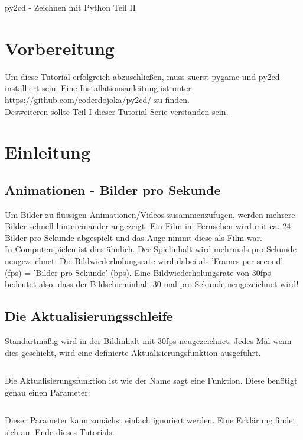 \documentclass{\VorlagenPfad/coderdojokatext}
\newcommand{\Titel}{py2cd - Zeichnen mit Python Teil II}
\begin{document}
\begin{center}
	{\huge \Titel}
\end{center}

\section{Vorbereitung}
Um diese Tutorial erfolgreich abzuschließen, muss zuerst pygame und py2cd installiert sein. Eine Installationsanleitung ist unter \url{https://github.com/coderdojoka/py2cd/} zu finden.
\\
Desweiteren sollte Teil I dieser Tutorial Serie verstanden sein.
\section{Einleitung}

\subsection{Animationen - Bilder pro Sekunde}
Um Bilder zu flüssigen Animationen/Videos zusammenzufügen, werden mehrere Bilder schnell hintereinander angezeigt. Ein Film im Fernsehen wird mit ca. 24 Bilder pro Sekunde abgespielt und das Auge nimmt diese als Film war.
\\In Computerspielen ist dies ähnlich. Der Spielinhalt wird mehrmals pro Sekunde neugezeichnet. Die Bildwiederholungsrate wird dabei als 'Frames per second' (fps) = 'Bilder pro Sekunde' (bps). Eine Bildwiederholungsrate von 30fps bedeutet also, dass der Bildschirminhalt 30 mal pro Sekunde neugezeichnet wird!

\subsection{Die Aktualisierungsschleife}
Standartmäßig wird in  der Bildinhalt mit 30fps neugezeichnet. Jedes Mal wenn dies geschieht, wird eine definierte Aktualisierungsfunktion ausgeführt.

\inputminted[firstline=3]{python}{../../../Beispiele/py2cd/aktualisierungs_funktion.py}

\begin{merkbox}
Die Aktualisierungsfunktion ist wie der Name sagt eine Funktion. Diese benötigt genau einen Parameter:

\inputminted[firstline=7, lastline=10]{python}{../../../Beispiele/py2cd/aktualisierungs_funktion.py}
\label{erklaerung}Dieser Parameter kann zunächst einfach ignoriert werden. Eine Erklärung findet sich am Ende dieses Tutorials.

\end{merkbox}
\end{document}
